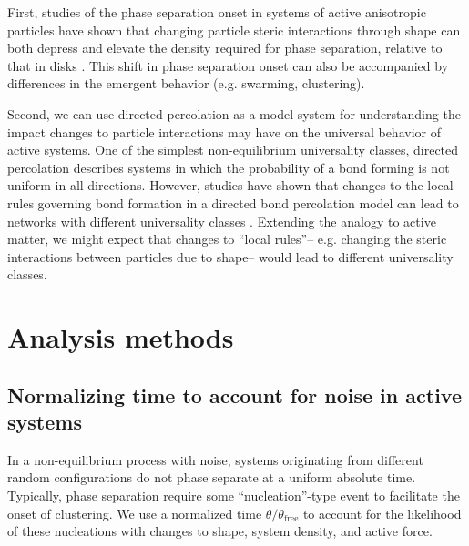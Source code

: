 First, studies of the phase separation onset in systems of active anisotropic particles have shown that changing particle steric interactions through shape can both depress and elevate the density required for phase separation, relative to that in disks \cite{Prymidis_2015_SoftMatter,Moran}. This shift in phase separation onset can also be accompanied by differences in the emergent behavior (e.g. swarming, clustering).


Second, we can use directed percolation as a model system for understanding the impact changes to particle interactions may have on the universal behavior of active systems.
One of the simplest non-equilibrium universality classes, directed percolation describes systems in which the probability of a bond forming is not uniform in all directions.
However, studies have shown that changes to the local rules governing bond formation in a directed bond percolation model can lead to networks with different universality classes \cite{TBD}.
Extending the analogy to active matter, we might expect that changes to ``local rules''-- e.g. changing the steric interactions between particles due to shape-- would lead to different universality classes.








\section{Analysis methods}

\subsection{Normalizing time to account for noise in active systems}

In a non-equilibrium process with noise, systems originating from different random configurations do not phase separate at a uniform absolute time.
Typically, phase separation require some ``nucleation''-type event to facilitate the onset of clustering.
We use a normalized time $\theta/\theta_\text{free}$ to account for the likelihood of these nucleations with changes to shape, system density, and active force.


